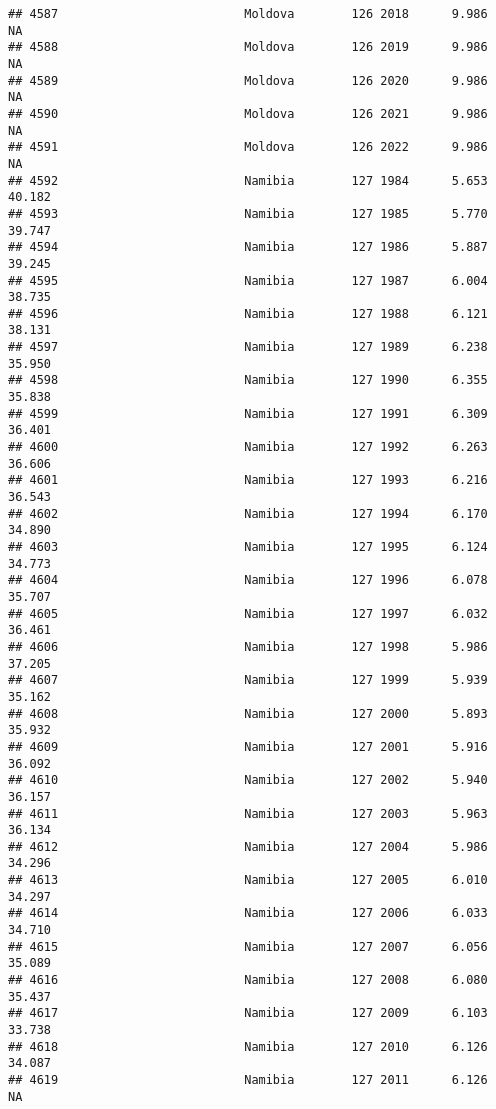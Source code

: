 \documentclass[
]{article}
\begin{document}
\begin{verbatim}
## 4587                          Moldova        126 2018      9.986         NA
## 4588                          Moldova        126 2019      9.986         NA
## 4589                          Moldova        126 2020      9.986         NA
## 4590                          Moldova        126 2021      9.986         NA
## 4591                          Moldova        126 2022      9.986         NA
## 4592                          Namibia        127 1984      5.653     40.182
## 4593                          Namibia        127 1985      5.770     39.747
## 4594                          Namibia        127 1986      5.887     39.245
## 4595                          Namibia        127 1987      6.004     38.735
## 4596                          Namibia        127 1988      6.121     38.131
## 4597                          Namibia        127 1989      6.238     35.950
## 4598                          Namibia        127 1990      6.355     35.838
## 4599                          Namibia        127 1991      6.309     36.401
## 4600                          Namibia        127 1992      6.263     36.606
## 4601                          Namibia        127 1993      6.216     36.543
## 4602                          Namibia        127 1994      6.170     34.890
## 4603                          Namibia        127 1995      6.124     34.773
## 4604                          Namibia        127 1996      6.078     35.707
## 4605                          Namibia        127 1997      6.032     36.461
## 4606                          Namibia        127 1998      5.986     37.205
## 4607                          Namibia        127 1999      5.939     35.162
## 4608                          Namibia        127 2000      5.893     35.932
## 4609                          Namibia        127 2001      5.916     36.092
## 4610                          Namibia        127 2002      5.940     36.157
## 4611                          Namibia        127 2003      5.963     36.134
## 4612                          Namibia        127 2004      5.986     34.296
## 4613                          Namibia        127 2005      6.010     34.297
## 4614                          Namibia        127 2006      6.033     34.710
## 4615                          Namibia        127 2007      6.056     35.089
## 4616                          Namibia        127 2008      6.080     35.437
## 4617                          Namibia        127 2009      6.103     33.738
## 4618                          Namibia        127 2010      6.126     34.087
## 4619                          Namibia        127 2011      6.126         NA

\end{verbatim}
\end{document}
